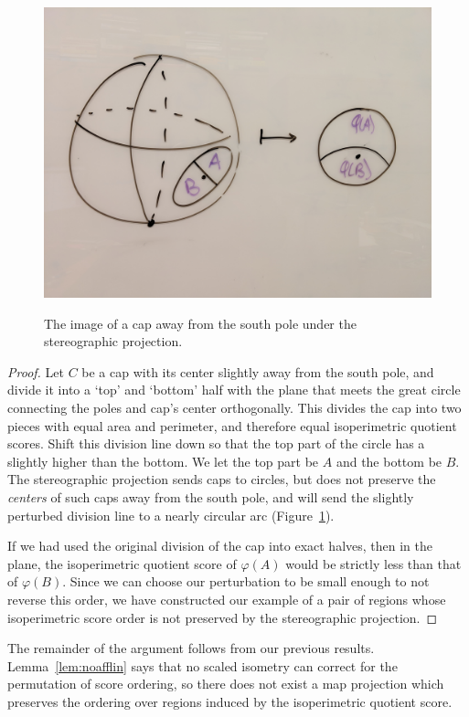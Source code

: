 \begin{figure}
    \centering
    \includegraphics[width=.8\textwidth]{figs/stereo_ipq.jpg}\\
    \caption{ The image of a cap away from the south pole under the stereographic projection. }
    \label{fig:stereoipq}
\end{figure}



\begin{proof}
Let $C$ be a cap with its center slightly away from the south pole, and divide it into a `top' and `bottom' half with the plane that meets the great circle connecting the poles and cap's center orthogonally.  This divides the cap into two pieces with equal area and perimeter, and therefore equal isoperimetric quotient scores.  Shift this division line down so that the top part of the circle has a slightly higher than the bottom.  We let the top part be $A$ and the bottom be $B$.  The stereographic projection sends caps to circles, but does not preserve the \textit{centers} of such caps away from the south pole, and will send the slightly perturbed division line to a nearly circular arc (Figure~\ref{fig:stereoipq}).  

If we had used the original division of the cap into exact halves, then in the plane, the isoperimetric quotient score of $\varphi(A)$ would be strictly less than that of $\varphi(B)$. Since we can choose our perturbation to be small enough to not reverse this order, we have constructed our example of a pair of regions whose isoperimetric score order is not preserved by the stereographic projection.

\end{proof}


The remainder of the argument follows from our previous results.  Lemma~\ref{lem:noafflin} says that no scaled isometry can correct for the permutation of score ordering, so there does not exist a map projection which preserves the ordering over regions induced by the isoperimetric quotient score.






